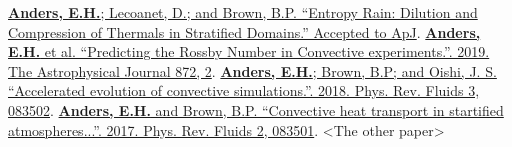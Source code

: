 


\fontsize{12pt}{1em}
\href{https://ui.adsabs.harvard.edu/abs/2019arXiv190602342A/abstract}{\textbf{Anders, E.H.}; Lecoanet, D.; and Brown, B.P. ``Entropy Rain: Dilution and Compression of Thermals in Stratified Domains.'' Accepted to ApJ}.
\newline
\href{https://iopscience.iop.org/article/10.3847/1538-4357/aaff61}{\textbf{Anders, E.H.} et al. ``Predicting the Rossby Number in Convective experiments.''. 2019. The Astrophysical Journal 872, 2}.
\newline
\href{https://journals.aps.org/prfluids/abstract/10.1103/PhysRevFluids.3.083502}{\textbf{Anders, E.H.}; Brown, B.P; and Oishi, J. S. ``Accelerated evolution of convective simulations.''. 2018.  Phys. Rev. Fluids 3, 083502}.
\newline
\href{https://journals.aps.org/prfluids/abstract/10.1103/PhysRevFluids.2.083501}{\textbf{Anders, E.H.} and Brown, B.P. ``Convective heat transport in startified atmospheres...''. 2017.  Phys. Rev. Fluids 2, 083501}.
\newline
<The other paper>
\normalsize

\hspace{-0.25cm}
